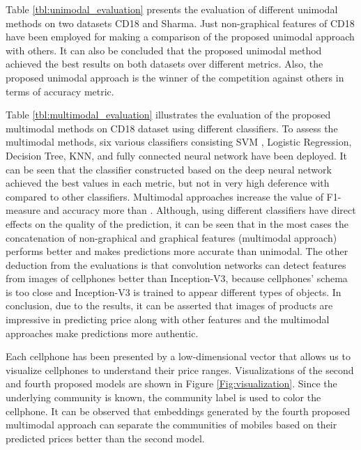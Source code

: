 \documentclass{svjour3}                     \smartqed  \usepackage{graphicx}
\begin{document}
Table \ref{tbl:unimodal_evaluation} presents the evaluation of different unimodal methods on two datasets CD18 and Sharma. Just non-graphical features of CD18 have been employed for making a comparison of the proposed unimodal approach with others. It can also be concluded that the proposed unimodal method achieved the best results on both datasets over different metrics. Also, the proposed unimodal approach is the winner of the competition against others in terms of accuracy metric.

Table \ref{tbl:multimodal_evaluation} illustrates the evaluation of the proposed multimodal methods on CD18 dataset using different classifiers. To assess the multimodal methods, six various classifiers consisting SVM \cite{Shi2011}, Logistic Regression, Decision Tree, KNN, and fully connected neural network have been deployed. It can be seen that the classifier constructed based on the deep neural network achieved the best values in each metric, but not in very high deference with compared to other classifiers. Multimodal approaches increase the value of F1-measure and accuracy more than .  
Although, using different classifiers have direct effects on the quality of the prediction, it can be seen that in the most cases the concatenation of non-graphical and graphical features (multimodal approach) performs better and makes predictions more accurate than unimodal. The other deduction from the evaluations is that convolution networks can detect features from images of cellphones better than Inception-V3, because cellphones' schema is too close and Inception-V3 is trained to appear different types of objects. In conclusion, due to the results, it can be asserted that images of products are impressive in predicting price along with other features and the multimodal approaches make predictions more authentic.

Each cellphone has been presented by a low-dimensional vector that allows us to visualize cellphones
to understand their price ranges. Visualizations of the second and fourth proposed models are shown in Figure \ref{Fig:visualization}. Since the underlying community is known, the community label is used to color the cellphone. It can be observed that embeddings generated by the fourth proposed multimodal approach can separate the communities of mobiles based on their predicted prices better than the second model.
\end{document}
